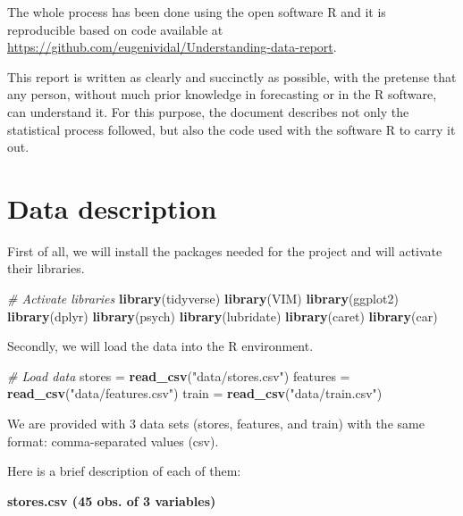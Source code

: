 \documentclass[11pt,]{article}
\newenvironment{Shaded}{\begin{snugshade}}{\end{snugshade}}
\newcommand{\KeywordTok}[1]{\textcolor[rgb]{0.13,0.29,0.53}{\textbf{{#1}}}}
\newcommand{\StringTok}[1]{\textcolor[rgb]{0.31,0.60,0.02}{{#1}}}
\newcommand{\CommentTok}[1]{\textcolor[rgb]{0.56,0.35,0.01}{\textit{{#1}}}}
\newcommand{\NormalTok}[1]{{#1}}
\begin{document}
The whole process has been done using the open software R and it is
reproducible based on code available at
\url{https://github.com/eugenividal/Understanding-data-report}.

This report is written as clearly and succinctly as possible, with the
pretense that any person, without much prior knowledge in forecasting or
in the R software, can understand it. For this purpose, the document
describes not only the statistical process followed, but also the code
used with the software R to carry it out.

\section{Data description}\label{data-description}

First of all, we will install the packages needed for the project and
will activate their libraries.

\begin{Shaded}
\begin{Highlighting}[]
\CommentTok{# Activate libraries}
\KeywordTok{library}\NormalTok{(tidyverse)}
\KeywordTok{library}\NormalTok{(VIM)}
\KeywordTok{library}\NormalTok{(ggplot2)}
\KeywordTok{library}\NormalTok{(dplyr)}
\KeywordTok{library}\NormalTok{(psych)}
\KeywordTok{library}\NormalTok{(lubridate)}
\KeywordTok{library}\NormalTok{(caret)}
\KeywordTok{library}\NormalTok{(car)}
\end{Highlighting}
\end{Shaded}

Secondly, we will load the data into the R environment.

\begin{Shaded}
\begin{Highlighting}[]
\CommentTok{# Load data}
\NormalTok{stores =}\StringTok{ }\KeywordTok{read_csv}\NormalTok{(}\StringTok{"data/stores.csv"}\NormalTok{)}
\NormalTok{features =}\StringTok{ }\KeywordTok{read_csv}\NormalTok{(}\StringTok{"data/features.csv"}\NormalTok{)}
\NormalTok{train =}\StringTok{ }\KeywordTok{read_csv}\NormalTok{(}\StringTok{"data/train.csv"}\NormalTok{)}
\end{Highlighting}
\end{Shaded}

We are provided with 3 data sets (stores, features, and train) with the
same format: comma-separated values (csv).

Here is a brief description of each of them:

\textbf{stores.csv (45 obs. of 3 variables)}
\end{document}
